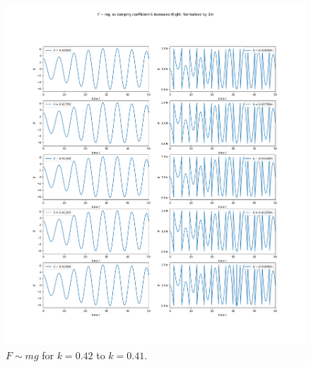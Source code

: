 \documentclass[10pt, twocolumn]{article}
\begin{document}
\begin{figure}[H]
    \centering
    \includegraphics[width = \columnwidth]{Projects/ForcedSimplePendulum/Plots/F~mg as damping coefficient k increases from 0.42 to 0.41.png}
    \caption{$F \sim{mg}$ for $k = 0.42$ to $k = 0.41$.}
    \label{k 0.42 to 0.41}
\end{figure}
\end{document}
